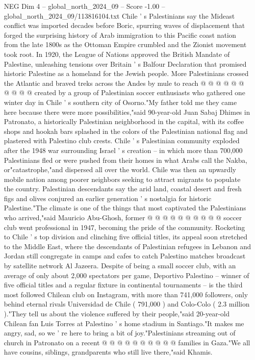 \begin{textsample}{NEG Dim 4 – global\_north\_2024\_09 – Score -1.00 – global\_north\_2024\_09/113816104.txt}
Chile ' s Palestinians say the Mideast conflict was imported decades before Boric, spurring waves of displacement that forged the surprising history of Arab immigration to this Pacific coast nation from the late 1800s as the Ottoman Empire crumbled and the Zionist movement took root.
In 1920, the League of Nations approved the British Mandate of Palestine, unleashing tensions over Britain ' s Balfour Declaration that promised historic Palestine as a homeland for the Jewish people.
More Palestinians crossed the Atlantic and braved treks across the Andes by mule to reach @ @ @ @ @ @ @ @ @ @ created by a group of Palestinian soccer enthusiasts who gathered one winter day in Chile ' s southern city of Osorno."My father told me they came here because there were more possibilities,"said 90-year-old Juan Sabaj Dhimes in Patronato, a historically Palestinian neighborhood in the capital, with its coffee shops and hookah bars splashed in the colors of the Palestinian national flag and plastered with Palestino club crests.
Chile ' s Palestinian community exploded after the 1948 war surrounding Israel ' s creation -- in which more than 700,000 Palestinians fled or were pushed from their homes in what Arabs call the Nakba, or"catastrophe,"and dispersed all over the world.
Chile was then an upwardly mobile nation among poorer neighbors seeking to attract migrants to populate the country.
Palestinian descendants say the arid land, coastal desert and fresh figs and olives conjured an earlier generation ' s nostalgia for historic Palestine."The climate is one of the things that most captivated the Palestinians who arrived,"said Mauricio Abu-Ghosh, former @ @ @ @ @ @ @ @ @ @ soccer club went professional in 1947, becoming the pride of the community.
Rocketing to Chile ' s top division and clinching five official titles, its appeal soon stretched to the Middle East, where the descendants of Palestinian refugees in Lebanon and Jordan still congregate in camps and cafes to catch Palestino matches broadcast by satellite network Al Jazeera.
Despite of being a small soccer club, with an average of only about 2,000 spectators per game, Deportivo Palestino -- winner of five official titles and a regular fixture in continental tournaments -- is the third most followed Chilean club on Instagram, with more than 741,000 followers, only behind eternal rivals Universidad de Chile ( 791,000 ) and Colo-Colo ( 2.3 million )."They tell us about the violence suffered by their people,"said 20-year-old Chilean fan Luis Torres at Palestino ' s home stadium in Santiago."It makes me angry, sad, so we ' re here to bring a bit of joy."Palestinians streaming out of church in Patronato on a recent @ @ @ @ @ @ @ @ @ @ families in Gaza."We all have cousins, siblings, grandparents who still live there,"said Khamis.

\end{textsample}
